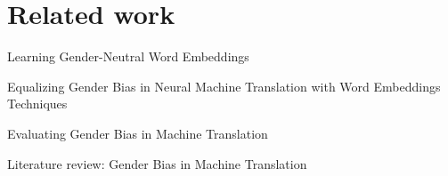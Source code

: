 \chapter{Related work}
\label{ch:Related_work}

Learning Gender-Neutral Word Embeddings \parencite{Zhao_2018}

Equalizing Gender Bias in Neural Machine Translation
with Word Embeddings Techniques \parencite{Escud_Font_2019}

Evaluating Gender Bias in Machine Translation \parencite{Stanovsky_2019}

Literature review: Gender Bias in Machine Translation \parencite{Savoldi_2021}

